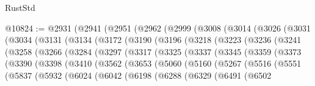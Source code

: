 \begin{lexlean}{RustStd}
\begin{coremodule}
{{{{{{{{{{{{{{{{{{{@10824 := @2931
    (@2941
      (@2951
        (@2962
          (@2999
            (@3008
              (@3014
                (@3026
                  (@3031
                    (@3034
                      (@3131
                        (@3134
                          (@3172
                            (@3190
                              (@3196
                                (@3218
                                  (@3223
                                    (@3236
                                      (@3241
                                        (@3258
                                          (@3266
                                            (@3284
                                              (@3297
                                                (@3317
                                                  (@3325
                                                    (@3337
                                                      (@3345
                                                        (@3359
                                                          (@3373
                                                            (@3390
                                                              (@3398
                                                                (@3410
                                                                  (@3562
                                                                    (@3653
                                                                      (@5060
                                                                        (@5160
                                                                          (@5267
                                                                            (@5516
                                                                              (@5551
                                                                                (@5837
                                                                                  (@5932
                                                                                    (@6024
                                                                                      (@6042
                                                                                        (@6198
                                                                                          (@6288
                                                                                            (@6329
                                                                                              (@6491
                                                                                                (@6502
}}}}}}}}}}}}}}}}}}}
\end{coremodule}
\end{lexlean}
